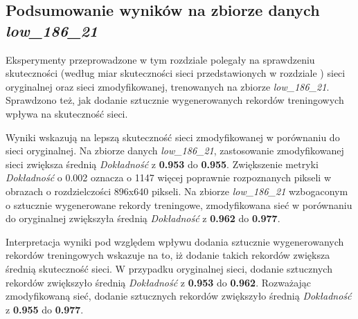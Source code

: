 \subsection{Podsumowanie wyników na zbiorze danych \textit{low\_186\_21}}
Eksperymenty przeprowadzone w tym rozdziale polegały na sprawdzeniu skuteczności (według miar skuteczności sieci przedstawionych w rozdziale ) sieci oryginalnej oraz sieci zmodyfikowanej, trenowanych na zbiorze \textit{low\_186\_21}.
Sprawdzono też, jak dodanie sztucznie wygenerowanych rekordów treningowych wpływa na skuteczność sieci.


Wyniki wskazują na lepszą skuteczność sieci zmodyfikowanej w porównaniu do sieci oryginalnej.
Na zbiorze danych \textit{low\_186\_21}, zastosowanie zmodyfikowanej sieci zwiększa średnią \textit{Dokładność} z \textbf{0.953} do \textbf{0.955}.
Zwiększenie metryki \textit{Dokładność} o 0.002 oznacza o 1147 więcej poprawnie rozpoznanych pikseli w obrazach o rozdzielczości 896x640 pikseli. Na zbiorze \textit{low\_186\_21} wzbogaconym o sztucznie wygenerowane rekordy treningowe, zmodyfikowana sieć w porównaniu do oryginalnej zwiększyła średnią \textit{Dokładność} z \textbf{0.962} do \textbf{0.977}.


Interpretacja wyniki pod względem wpływu dodania sztucznie wygenerowanych rekordów treningowych wskazuje na to, iż dodanie takich rekordów zwiększa średnią skuteczność sieci. W przypadku oryginalnej sieci, dodanie sztucznych rekordów zwiększyło średnią \textit{Dokładność} z \textbf{0.953} do \textbf{0.962}. Rozważając zmodyfikowaną sieć, dodanie sztucznych rekordów zwiększyło średnią \textit{Dokładność} z \textbf{0.955} do \textbf{0.977}.
